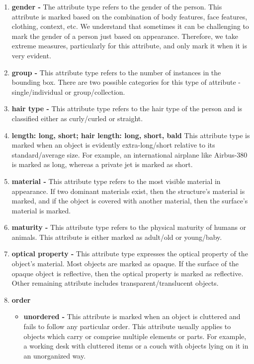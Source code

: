 \documentclass[10pt,twocolumn,letterpaper]{article}
\begin{document}
\begin{enumerate}
\item \textbf{gender -} The attribute type refers to the gender of the person. This attribute is marked based on the combination of body features, face features, clothing, context, etc. We understand that sometimes it can be challenging to mark the gender of a person just based on appearance. Therefore, we take extreme measures, particularly for this attribute, and only mark it when it is very evident. 

\item \textbf{group -} This attribute type refers to the number of instances in the bounding box. There are two possible categories for this type of attribute - single/individual or group/collection. 

\item \textbf{hair type -} This attribute type refers to the hair type of the person and is classified either as curly/curled or straight.

\item \textbf{length: long, short; hair length: long, short, bald} This attribute type is marked when an object is evidently extra-long/short relative to its standard/average size. 
    For example, an international airplane like Airbus-380 is marked as long, whereas a private jet is marked as short. 


\item \textbf{material -} This attribute type refers to the most visible material in appearance. If two dominant materials exist, then the structure's material is marked, and if the object is covered with another material, then the surface's material is marked.  
       
\item \textbf{maturity -} This attribute type refers to the physical maturity of humans or animals. This attribute is either marked as adult/old or young/baby. 


\item \textbf{optical property -} This attribute type expresses the optical property of the object's material. Most objects are marked as opaque. If the surface of the opaque object is reflective, then the optical property is marked as reflective. Other remaining attribute includes transparent/translucent objects.
    
\item{\textbf{order}} 
    \begin{itemize}
        \item \textbf{unordered -} This attribute is marked when an object is cluttered and fails to follow any particular order. This attribute usually applies to objects which carry or comprise multiple elements or parts. For example, a working desk with cluttered items or a couch with objects lying on it in an unorganized way.
    

\end{itemize}
\end{enumerate}
\end{document}
